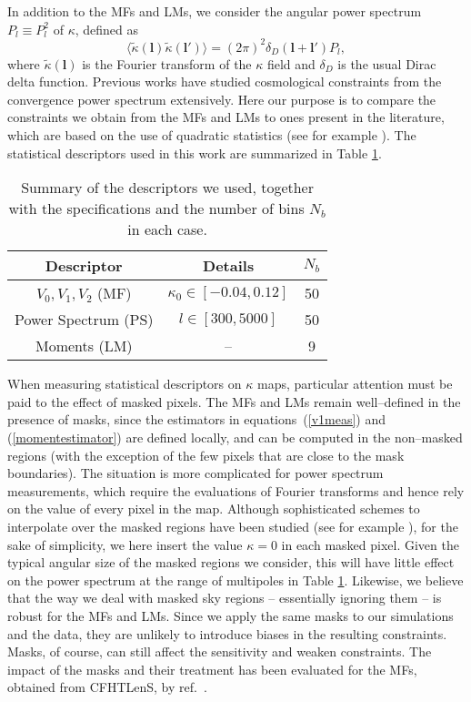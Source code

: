 \documentclass[reprint,aps,prd,superscriptaddress,showkeys,showpacs]{revtex4-1}
\begin{document}
In addition to the MFs and LMs, we consider the angular power spectrum
$P_l\equiv P^2_l$ of $\kappa$, defined as
\begin{equation}
\label{powerspectrum}
\langle\tilde{\kappa}(\mathbf{l})\tilde{\kappa}(\mathbf{l}')\rangle=(2\pi)^2\delta_D(\mathbf{l}+\mathbf{l}')P_l,
\end{equation}  
%
where $\tilde{\kappa}(\mathbf{l})$ is the Fourier transform of the
$\kappa$ field and $\delta_D$ is the usual Dirac delta
function. Previous works have studied cosmological constraints from
the convergence power spectrum extensively.  Here our purpose is to
compare the constraints we obtain from the MFs and LMs to ones present
in the literature, which are based on the use of quadratic statistics
(see for example \citep{CFHTKilbinger}). The statistical descriptors
used in this work are summarized in Table \ref{desctable}.
%
\begin{table}
\begin{tabular}{c|c|c} \hline
Descriptor & Details & $N_b$ \\ \hline
$V_0,V_1,V_2$ (MF) & $\kappa_0\in[-0.04,0.12]$ & 50 \\
Power Spectrum (PS) & $l \in [300,5000]$ & 50 \\
Moments (LM) & -- & 9 \\
\end{tabular}
\caption{Summary of the descriptors we used, together with the specifications and the number of bins $N_b$ in each case.}
\label{desctable}
\end{table}
%

When measuring statistical descriptors on $\kappa$ maps, particular
attention must be paid to the effect of masked pixels. The MFs and LMs
remain well--defined in the presence of masks, since the estimators in
equations~(\ref{v1meas}) and (\ref{momentestimator}) are defined
locally, and can be computed in the non--masked regions (with the
exception of the few pixels that are close to the mask
boundaries). The situation is more complicated for power spectrum
measurements, which require the evaluations of Fourier transforms and
hence rely on the value of every pixel in the map. Although
sophisticated schemes to interpolate over the masked regions have been
studied (see for example \citep{VplasInterpolation}), for the sake of
simplicity, we here insert the value $\kappa=0$ in each masked pixel.
Given the typical angular size of the masked regions we consider, this
will have little effect on the power spectrum at the range of
multipoles in Table \ref{desctable}. 
Likewise, we believe that the way we deal with masked sky regions --
essentially ignoring them -- is robust for the MFs and LMs. Since we
apply the same masks to our simulations and the data, they are
unlikely to introduce biases in the resulting constraints.  Masks, of
course, can still affect the sensitivity and weaken constraints. The
impact of the masks and their treatment has been evaluated for the
MFs, obtained from CFHTLenS, by ref.~\citep{CFHTMasato}.
\end{document}
